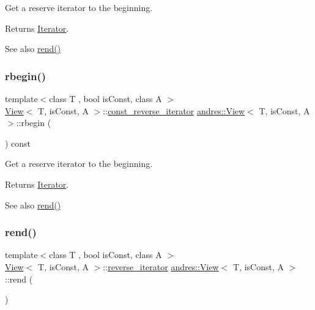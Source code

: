 Get a reserve iterator to the beginning.

\begin{DoxyReturn}{Returns}
\hyperlink{classandres_1_1Iterator}{Iterator}. 
\end{DoxyReturn}
\begin{DoxySeeAlso}{See also}
\hyperlink{classandres_1_1View_a27d6bad469c2e4590e0fa9f00108c36e}{rend()} 
\end{DoxySeeAlso}
\mbox{\label{classandres_1_1View_aab9bb48b2bb31d78aab476a197055538}} 
\subsubsection{\texorpdfstring{rbegin()}{rbegin()}\hspace{0.1cm}{\footnotesize\ttfamily [2/2]}}
{\footnotesize\ttfamily template$<$class T , bool is\+Const, class A $>$ \\
\hyperlink{classandres_1_1View}{View}$<$ T, is\+Const, A $>$\+::\hyperlink{classandres_1_1View_a61656971b73a48c8bf009e3200aad900}{const\+\_\+reverse\+\_\+iterator} \hyperlink{classandres_1_1View}{andres\+::\+View}$<$ T, is\+Const, A $>$\+::rbegin (\begin{DoxyParamCaption}{ }\end{DoxyParamCaption}) const\hspace{0.3cm}{\ttfamily [inline]}}

Get a reserve iterator to the beginning.

\begin{DoxyReturn}{Returns}
\hyperlink{classandres_1_1Iterator}{Iterator}. 
\end{DoxyReturn}
\begin{DoxySeeAlso}{See also}
\hyperlink{classandres_1_1View_a27d6bad469c2e4590e0fa9f00108c36e}{rend()} 
\end{DoxySeeAlso}
\mbox{\label{classandres_1_1View_a27d6bad469c2e4590e0fa9f00108c36e}} 
\subsubsection{\texorpdfstring{rend()}{rend()}\hspace{0.1cm}{\footnotesize\ttfamily [1/2]}}
{\footnotesize\ttfamily template$<$class T , bool is\+Const, class A $>$ \\
\hyperlink{classandres_1_1View}{View}$<$ T, is\+Const, A $>$\+::\hyperlink{classandres_1_1View_aab07af42756759420211d114bb705547}{reverse\+\_\+iterator} \hyperlink{classandres_1_1View}{andres\+::\+View}$<$ T, is\+Const, A $>$\+::rend (\begin{DoxyParamCaption}{ }\end{DoxyParamCaption})\hspace{0.3cm}{\ttfamily [inline]}}

